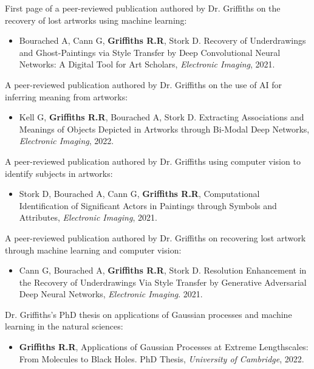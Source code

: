 \documentclass[11pt]{article}
\begin{document}
\begin{thebibliography}{9}
First page of a peer-reviewed publication authored by Dr. Griffiths on the recovery of lost artworks using machine learning:
\begin{itemize}
\item Bourached A, Cann G, \textbf{Griffiths R.R}, Stork D. Recovery of Underdrawings and Ghost-Paintings via Style Transfer by Deep Convolutional Neural Networks: A Digital Tool for Art Scholars, \textit{Electronic Imaging}, 2021.
\end{itemize}

A peer-reviewed publication authored by Dr. Griffiths on the use of AI for inferring meaning from artworks:
\begin{itemize}
\item Kell G, \textbf{Griffiths R.R}, Bourached A, Stork D. Extracting Associations and Meanings of Objects Depicted in Artworks through Bi-Modal Deep Networks, \textit{Electronic Imaging}, 2022.
\end{itemize}

A peer-reviewed publication authored by Dr. Griffiths using computer vision to identify subjects in artworks:
\begin{itemize}
\item Stork D, Bourached A, Cann G, \textbf{Griffiths R.R}, Computational Identification of Significant Actors in Paintings through Symbols and Attributes, \textit{Electronic Imaging}, 2021.
\end{itemize}

A peer-reviewed publication authored by Dr. Griffiths on recovering lost artwork through machine learning and computer vision:
\begin{itemize}
\item Cann G, Bourached A, \textbf{Griffiths R.R}, Stork D. Resolution Enhancement in the Recovery of Underdrawings Via Style Transfer by Generative Adversarial Deep Neural Networks, \textit{Electronic Imaging}. 2021.
\end{itemize}

Dr. Griffiths's PhD thesis on applications of Gaussian processes and machine learning in the natural sciences:
\begin{itemize}
\item \textbf{Griffiths R.R}, Applications of Gaussian Processes at Extreme Lengthscales: From Molecules to Black Holes. PhD Thesis, \textit{University of Cambridge}, 2022.
\end{itemize}


\end{thebibliography}
\end{document}
